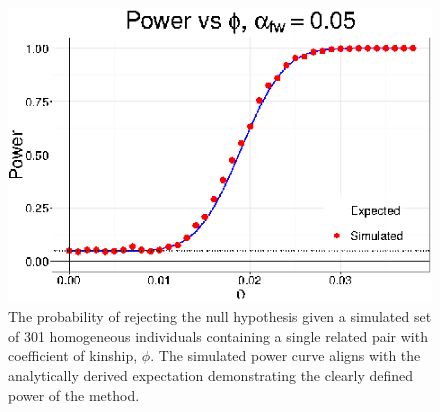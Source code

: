 \begin{figure}
\includegraphics[width=1\columnwidth]{./figures/power_curve}\caption{The probability of rejecting the null hypothesis given a simulated
set of 301 homogeneous individuals containing a single related pair
with coefficient of kinship, $\phi$. The simulated power curve aligns
with the analytically derived expectation demonstrating the clearly
defined power of the method.}
\end{figure}


